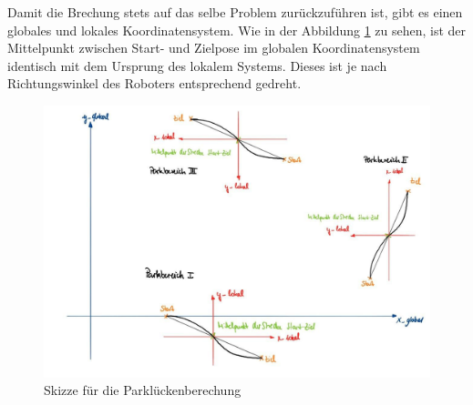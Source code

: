 \noindent Damit die Brechung stets auf das selbe Problem zurückzuführen ist, gibt es einen globales und lokales Koordinatensystem. Wie in der Abbildung \ref{img:grafik-Parkluecke} zu sehen, ist der Mittelpunkt zwischen Start- und Zielpose im globalen Koordinatensystem identisch mit dem Ursprung des lokalem Systems. Dieses ist je nach Richtungswinkel des Roboters entsprechend gedreht. \\
   
\begin{figure}[h]
	\centering
	\includegraphics[width=1\textwidth]{Skizze_Parklueckenberechung}
	\caption{Skizze für die Parklückenberechung}
	\label{img:grafik-Parkluecke}
\end{figure}